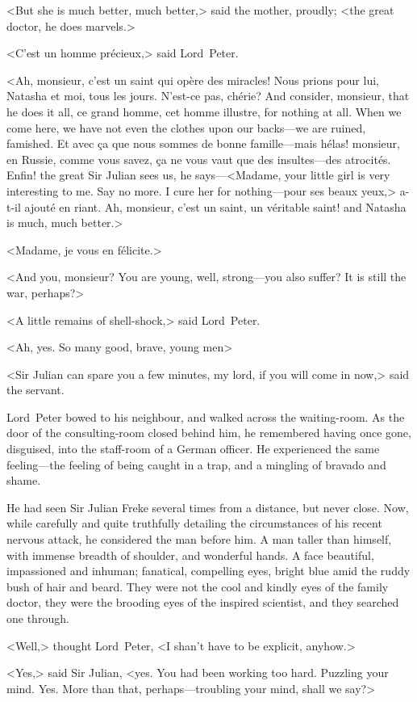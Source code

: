 <But she is much better, much better,> said the mother, proudly; <the great doctor, he does marvels.>

<C'est un homme précieux,> said Lord~Peter.

<Ah, monsieur, c'est un saint qui opère des miracles! Nous prions pour lui, Natasha et moi, tous les jours. N'est-ce pas, chérie? And consider, monsieur, that he does it all, ce grand homme, cet homme illustre, for nothing at all. When we come here, we have not even the clothes upon our backs—we are ruined, famished. Et avec ça que nous sommes de bonne famille—mais hélas! monsieur, en Russie, comme vous savez, ça ne vous vaut que des insultes—des atrocités. Enfin! the great Sir Julian sees us, he says—<Madame, your little girl is very interesting to me. Say no more. I cure her for nothing—pour ses beaux yeux,> a-t-il ajouté en riant. Ah, monsieur, c'est un saint, un véritable saint! and Natasha is much, much better.>

<Madame, je vous en félicite.>

<And you, monsieur? You are young, well, strong—you also suffer? It is still the war, perhaps?>

<A little remains of shell-shock,> said Lord~Peter.

<Ah, yes. So many good, brave, young men\longdash>

<Sir Julian can spare you a few minutes, my lord, if you will come in now,> said the servant.

Lord~Peter bowed to his neighbour, and walked across the waiting-room. As the door of the consulting-room closed behind him, he remembered having once gone, disguised, into the staff-room of a German officer. He experienced the same feeling—the feeling of being caught in a trap, and a mingling of bravado and shame.

He had seen Sir Julian Freke several times from a distance, but never close. Now, while carefully and quite truthfully detailing the circumstances of his recent nervous attack, he considered the man before him. A man taller than himself, with immense breadth of shoulder, and wonderful hands. A face beautiful, impassioned and inhuman; fanatical, compelling eyes, bright blue amid the ruddy bush of hair and beard. They were not the cool and kindly eyes of the family doctor, they were the brooding eyes of the inspired scientist, and they searched one through.

<Well,> thought Lord~Peter, <I shan't have to be explicit, anyhow.>

<Yes,> said Sir Julian, <yes. You had been working too hard. Puzzling your mind. Yes. More than that, perhaps—troubling your mind, shall we say?>


